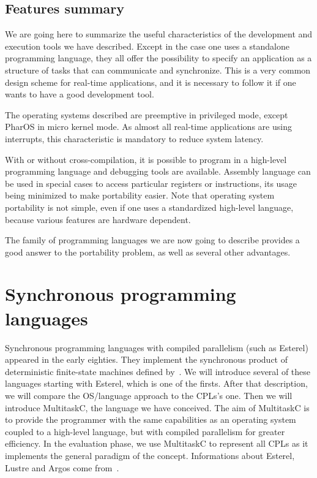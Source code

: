 \documentclass[10pt]{report}
\begin{document}
\subsection{Features summary}

We are going here to summarize the useful characteristics of the development and execution tools we have described. Except
in the case one uses a standalone programming language, they all offer the possibility to specify an application as a structure of tasks
that can communicate and synchronize. This is a very common design scheme for real-time applications, and it is necessary to follow it 
if one wants to have a good development tool.

The operating systems described are preemptive in privileged mode, except PharOS in micro kernel mode. As almost all
real-time applications are using interrupts, this characteristic is mandatory to reduce system latency.

With or without cross-compilation, it is possible to program in a high-level programming language and debugging tools are available. 
Assembly language can be used in special cases to access particular registers or instructions, its usage being minimized to make 
portability easier. Note that operating system portability is not simple, even if one uses a standardized high-level language, because 
various features are hardware dependent.

The family of programming languages we are now going to describe provides a good answer to the portability problem, as well as several other advantages.

\section{Synchronous programming languages}

Synchronous programming languages with compiled parallelism (such as Esterel) appeared in the early eighties. They implement the synchronous product
of deterministic finite-state machines defined by~\cite{ArnoldNivat:82}. We will introduce several of these languages starting with
Esterel, which is one of the firsts. After that description, we will compare the OS/language approach to the CPLs's one. Then we will introduce MultitaskC, 
the language we have conceived. The aim of MultitaskC is to provide the programmer with the same capabilities as an operating system coupled to a high-level 
language, but with compiled parallelism for greater efficiency. In the evaluation phase, we use MultitaskC to represent all CPLs as it implements the general 
paradigm of the concept. Informations about Esterel, Lustre and Argos come from~\cite{Halbwachs:91}.
\end{document}
